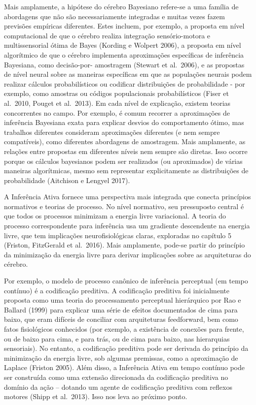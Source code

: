 \documentclass[
  12pt,
]{book}
\begin{document}
Mais amplamente, a hipótese do cérebro Bayesiano refere-se a uma família de abordagens que não são necessariamente integradas e muitas vezes fazem previsões empíricas diferentes. Estes incluem, por exemplo, a proposta em nível computacional de que o cérebro realiza integração sensório-motora e multissensorial ótima de Bayes (Kording e Wolpert 2006), a proposta em nível algorítmico de que o cérebro implementa aproximações específicas de inferência Bayesiana, como decisão-por- amostragem (Stewart et al.~2006), e as propostas de nível neural sobre as maneiras específicas em que as populações neurais podem realizar cálculos probabilísticos ou codificar distribuições de probabilidade - por exemplo, como amostras ou códigos populacionais probabilísticos (Fiser et al.~2010, Pouget et al.~2013). Em cada nível de explicação, existem teorias concorrentes no campo. Por exemplo, é comum recorrer a aproximações de inferência Bayesiana exata para explicar desvios do comportamento ótimo, mas trabalhos diferentes consideram aproximações diferentes (e nem sempre compatíveis), como diferentes abordagens de amostragem. Mais amplamente, as relações entre propostas em diferentes níveis nem sempre são diretas. Isso ocorre porque os cálculos bayesianos podem ser realizados (ou aproximados) de várias maneiras algorítmicas, mesmo sem representar explicitamente as distribuições de probabilidade (Aitchison e Lengyel 2017).

A Inferência Ativa fornece uma perspectiva mais integrada que conecta princípios normativos e teorias de processo. No nível normativo, seu pressuposto central é que todos os processos minimizam a energia livre variacional. A teoria do processo correspondente para inferência usa um gradiente descendente na energia livre, que tem implicações neurofisiológicas claras, exploradas no capítulo 5 (Friston, FitzGerald et al.~2016). Mais amplamente, pode-se partir do princípio da minimização da energia livre para derivar implicações sobre as arquiteturas do cérebro.

Por exemplo, o modelo de processo canônico de inferência perceptual (em tempo contínuo) é a codificação preditiva. A codificação preditiva foi inicialmente proposta como uma teoria do processamento perceptual hierárquico por Rao e Ballard (1999) para explicar uma série de efeitos documentados de cima para baixo, que eram difíceis de conciliar com arquiteturas feedforward, bem como fatos fisiológicos conhecidos (por exemplo, a existência de conexões para frente, ou de baixo para cima, e para trás, ou de cima para baixo, nas hierarquias sensoriais). No entanto, a codificação preditiva pode ser derivada do princípio da minimização da energia livre, sob algumas premissas, como a aproximação de Laplace (Friston 2005). Além disso, a Inferência Ativa em tempo contínuo pode ser construída como uma extensão direcionada da codificação preditiva no domínio da ação -- dotando um agente de codificação preditiva com reflexos motores (Shipp et al.~2013). Isso nos leva ao próximo ponto.
\end{document}
